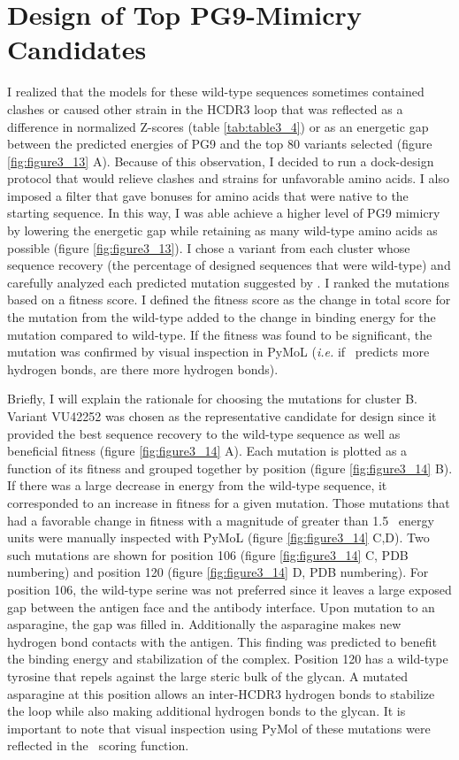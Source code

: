 \section{Design of Top PG9-Mimicry Candidates}
I realized that the models for these wild-type sequences sometimes contained clashes or caused other strain in the HCDR3 loop that was reflected as a difference in normalized Z-scores (table \ref{tab:table3_4}) or as an energetic gap between the predicted energies of PG9 and the top 80 variants selected (figure \ref{fig:figure3_13} A). Because of this observation, I decided to run a dock-design protocol that would relieve clashes and strains for unfavorable amino acids. I also imposed a filter that gave bonuses for amino acids that were native to the starting sequence. In this way, I was able achieve a higher level of PG9 mimicry by lowering the energetic gap while retaining as many wild-type amino acids as possible (figure \ref{fig:figure3_13}). I chose a variant from each cluster whose sequence recovery (the percentage of designed sequences that were wild-type) and carefully analyzed each predicted mutation suggested by \rosetta. I ranked the mutations based on a fitness score. I defined the fitness score as the change in total score for the mutation from the wild-type added to the change in binding energy for the mutation compared to wild-type. If the fitness was found to be significant, the mutation was confirmed by visual inspection in PyMoL (\textit{i.e.} if \rosetta~predicts more hydrogen bonds, are there more hydrogen bonds).

Briefly, I will explain the rationale for choosing the mutations for cluster B. Variant VU42252 was chosen as the representative candidate for design since it provided the best sequence recovery to the wild-type sequence as well as beneficial fitness (figure \ref{fig:figure3_14} A). Each mutation is plotted as a function of its fitness and grouped together by position (figure \ref{fig:figure3_14} B). If there was a large decrease in energy from the wild-type sequence, it corresponded to an increase in fitness for a given mutation. Those mutations that had a favorable change in fitness with a magnitude of greater than 1.5 \rosetta~energy units were manually inspected with PyMoL (figure \ref{fig:figure3_14} C,D). Two such mutations are shown for position 106 (figure \ref{fig:figure3_14} C, PDB numbering) and position 120 (figure \ref{fig:figure3_14} D, PDB numbering). For position 106, the wild-type serine was not preferred since it leaves a large exposed gap between the antigen face and the antibody interface. Upon mutation to an asparagine, the gap was filled in. Additionally the asparagine makes new hydrogen bond contacts with the antigen. This finding was predicted to benefit the binding energy and stabilization of the complex. Position 120 has a wild-type tyrosine that repels against the large steric bulk of the glycan. A mutated asparagine at this position allows an inter-HCDR3 hydrogen bonds to stabilize the loop while also making additional hydrogen bonds to the glycan. It is important to note that visual inspection using PyMol of these mutations were reflected in the \rosetta~scoring function.

